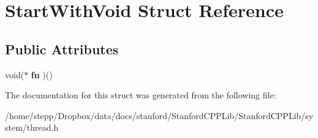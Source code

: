 \hypertarget{structStartWithVoid}{}\section{Start\+With\+Void Struct Reference}
\label{structStartWithVoid}
\subsection*{Public Attributes}
\begin{DoxyCompactItemize}
\item 
\mbox{\label{structStartWithVoid_a65470ba81af4b69d47104b8a5546839c}} 
void($\ast$ {\bfseries fn} )()
\end{DoxyCompactItemize}


The documentation for this struct was generated from the following file\+:\begin{DoxyCompactItemize}
\item 
/home/stepp/\+Dropbox/data/docs/stanford/\+Stanford\+C\+P\+P\+Lib/\+Stanford\+C\+P\+P\+Lib/system/thread.\+h\end{DoxyCompactItemize}
